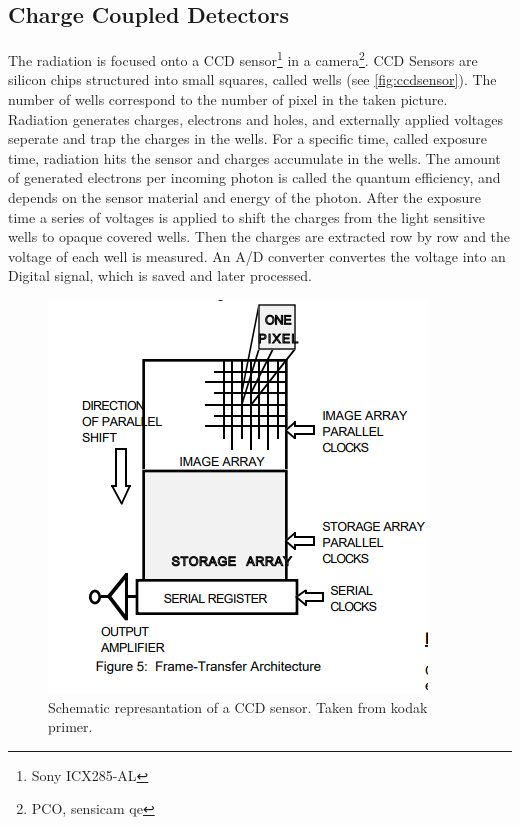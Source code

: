 \subsection{Charge Coupled Detectors}
The radiation is focused onto a CCD sensor\footnote{Sony ICX285-AL} in a camera\footnote{PCO, sensicam qe}. CCD Sensors are silicon chips structured into small squares, called wells (see \autoref{fig:ccdsensor}). The number of wells correspond to the number of pixel in the taken picture. Radiation generates charges, electrons and holes, and externally applied voltages seperate and trap the charges in the wells. For a specific time, called exposure time, radiation hits the sensor and charges accumulate in the wells. The amount of generated electrons per incoming photon is called the quantum efficiency, and depends on the sensor material and energy of the photon. After the exposure time a series of voltages is applied to shift the charges from the light sensitive wells to opaque covered wells. Then the charges are extracted row by row and the voltage of each well is measured. An A/D converter convertes the voltage into an Digital signal, which is saved and later processed.
\begin{figure}
	\centering
	\includegraphics[width=0.7\linewidth]{Images/ExperimentalSetup/CCD_Sensor}
	\caption{Schematic represantation of a CCD sensor. Taken from kodak primer.}
	\label{fig:ccdsensor}
\end{figure}

